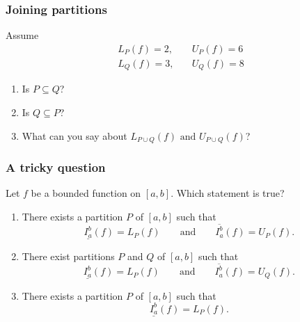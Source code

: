 \documentclass[14pt]{beamer}
\newcommand{\p}{\pause}
\newcommand{\setsize}[1]{\fontsize{#1}{#1}\selectfont} %
\newcommand{\smallerfont}{\setsize{13}} %
\newcommand{\lifab}{\underline{I_a^b}(f)}
\newcommand{\uifab}{\overline{I_a^b}(f)}
\newcommand{\puntos}[2]{ \draw[thick] (-5,0) to (5,0);

\draw[decorate, decoration={brace, amplitude=10pt}, yshift=10pt] (#1-3.5,-0) -- (#1-0,-0)
node [red,midway,yshift=20pt]{lower sums};

\draw[red, fill] (#1-2.5,0) circle [radius=0.1] ; \draw[red, fill] (#1-3.3,0)
circle [radius=0.1] ; \draw[red, fill] (#1-2.0,0) circle [radius=0.1] ; \draw[red,
fill] (#1-1.8,0) circle [radius=0.1] ; \draw[red, fill] (#1-1.3,0) circle [radius=0.1]
; \draw[red, fill] (#1-0.8,0) circle [radius=0.1] ; \draw[red, fill] (#1-0.5,0) circle
[radius=0.1] ; \draw[red, fill] (#1-0.2,0) circle [radius=0.1] ; \draw[red, fill]
(#1-0.05,0) circle [radius=0.1] ;

\draw[decorate, decoration={brace, amplitude=10pt}, yshift=10pt] (#2+0,0) -- (#2+3.5,0)
node [verde,midway,yshift=20pt]{upper sums};

\draw[verde, fill] (#2+2.7,0) circle [radius=0.1] ; \draw[verde, fill] (#2+3.1,0)
circle [radius=0.1] ; \draw[verde, fill] (#2+1.8,0) circle [radius=0.1] ; \draw[verde,
fill] (#2+1.5,0) circle [radius=0.1] ; \draw[verde, fill] (#2+1.2,0) circle [radius=0.1]
; \draw[verde, fill] (#2+0.7,0) circle [radius=0.1] ; \draw[verde, fill] (#2+0.4,0)
circle [radius=0.1] ; \draw[verde, fill] (#2+0.2,0) circle [radius=0.1] ; \draw[verde,
fill] (#2+0.03,0) circle [radius=0.1] ; }
\begin{document}
	\begin{frame}[t]
		\frametitle{Joining partitions}

		Assume
		\begin{align*}
			L_{P}(f)=2, & \quad U_{P}(f)=6 \\
			L_{Q}(f)=3, & \quad U_{Q}(f)=8
		\end{align*}

		\begin{enumerate}
			\item Is ${\displaystyle P \subseteq Q}$?

			\item Is ${\displaystyle Q \subseteq P}$?

			\item What can you say about ${\displaystyle L_{P \cup Q}(f) \mbox{ and } U_{P \cup Q}(f) }$?
		\end{enumerate}
	\end{frame}
	\begin{frame}[t]
		\smallerfont
		\frametitle{A tricky question}

		Let $f$ be a bounded function on $[a,b]$. Which statement is true?

		\begin{enumerate}
			\item There exists a partition $P$ of $[a,b]$ such that
				\[
					\lifab=L_{P}(f) \quad \quad \mbox{and}\quad \quad \uifab=U_{P}(f).
				\]

			\item There exist partitions $P$ and $Q$ of $[a,b]$ such that
				\[
					\lifab=L_{P}(f) \quad \quad \mbox{and}\quad \quad \uifab=U_{Q}(f).
				\]
				\p

			\item There exists a partition $P$ of $[a,b]$ such that
				\[
					\lifab=L_{P}(f).
				\]
		\end{enumerate}

		\begin{center}
		\end{center}
	\end{frame}
\end{document}
